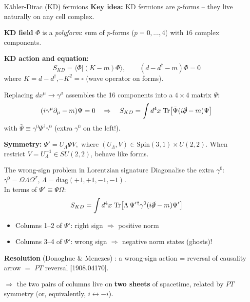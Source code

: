 \documentclass[aspectratio=169]{beamer}
\newcommand{\Red}[1]{{\color{cptred}#1}}
\newcommand{\Blue}[1]{{\color{cptblue}#1}}
\newcommand{\Green}[1]{{\color{cptgreen}#1}}
\begin{document}
\begin{frame}{K\"{a}hler-Dirac (KD) fermions}
  \textbf{Key idea:} KD fermions are $p$-forms -- they live naturally on any cell complex.

  \vspace{0.5em}
  \textbf{KD field} $\Phi$ is a \emph{polyform}: sum of $p$-forms ($p=0,\ldots,4$) with $16$ complex components.

  \vspace{0.4em}
  \textbf{KD action and equation:}
  \[
    S_{KD} = \langle\bar\Phi|(K-m)\Phi\rangle, \qquad
    (d - d^\dagger - m)\Phi = 0
  \]
  where $K = d - d^\dagger$,\quad $-K^2 = \square$ (wave operator on forms).

  \vspace{0.4em}
  Replacing $dx^\mu \to \gamma^\mu$ assembles the 16 components into a $4\times4$ matrix $\Psi$:
  \[
    (i\gamma^\mu\partial_\mu - m)\Psi = 0
    \quad\Rightarrow\quad
    S_{KD} = \int d^4x\;\mathrm{Tr}\!\left[\bar\Psi(i\slashed\partial - m)\Psi\right]
  \]
  with $\bar\Psi \equiv \gamma^0\Psi^\dagger\gamma^0$ (extra $\gamma^0$ on the left!).

  \vspace{0.3em}
  \textbf{Symmetry:} $\Psi'=U_{\Lambda} \Psi V, $ where $(U_{\Lambda}, V)\in \text{Spin}(3,1)\times U(2,2)$. 
  When restrict $V=U_{\Lambda}^{-1} \in SU(2,2)$, behave like forms.
\end{frame}

\begin{frame}{The wrong-sign problem in Lorentzian signature}
  Diagonalise the extra $\gamma^0$: $\gamma^0 = \Omega\Lambda\Omega^T$,
  $\Lambda = \mathrm{diag}(+1,+1,-1,-1)$.\\[0.5em]
  In terms of $\Psi' \equiv \Psi\Omega$:
  \[
    S_{KD} = \int d^4x\;\mathrm{Tr}\!\left[\Lambda\,\Psi'{}^\dagger\gamma^0
             (i\slashed\partial - m)\Psi'\right]
  \]
  \begin{itemize}
    \item Columns 1--2 of $\Psi'$: \Green{right sign} $\Rightarrow$ positive norm
    \item Columns 3--4 of $\Psi'$: \Red{wrong sign} $\Rightarrow$ \Red{negative norm states (ghosts)!}
  \end{itemize}

  \vspace{0.5em}
  \textbf{Resolution} (Donoghue \& Menezes) : a wrong-sign action = reversal of causality arrow
  $=$ \Blue{$PT$ reversal} \small [1908.04170].

  \vspace{0.4em}
  $\Rightarrow$ the two pairs of columns live on \textbf{two sheets} of spacetime, related by $PT$ symmetry
  (or, equivalently, $i \leftrightarrow -i$).
\end{frame}
\end{document}
